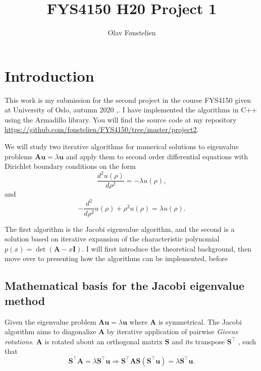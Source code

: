 \documentclass[]{article}
\title{FYS4150 H20 Project 1}
\author{Olav Fønstelien}
\begin{document}
\maketitle

\begin{abstract}

\end{abstract}

\section{Introduction}

This work is my submission for the second project in the course FYS4150 given at University of Oslo, autumn 2020 \cite{fys4150},\cite{fys4150-p2}. I have implemented the algorithms in C++ using the Armadillo library. You will find the source code at my repository \url{https://github.com/fonstelien/FYS4150/tree/master/project2}.

We will study two iterative algorithms for numerical solutions to eigenvalue problems $\mathbf{Au} = \lambda \mathbf{u}$ and apply them to second order differential equations with Dirichlet boundary conditions on the form
\begin{equation}
\label{diff_1}
	\frac{d^2 u(\rho)}{d\rho^2} = -\lambda u(\rho),
\end{equation}
and
\begin{equation}
\label{diff_2}
	-\frac{d^2}{d\rho^2} u(\rho) + \rho^2u(\rho)  = \lambda u(\rho).
\end{equation}

The first algorithm is the Jacobi eigenvalue algorithm, and the second is a solution based on iterative expansion of the characteristic polynomial $p(x) = \det(\mathbf{A} - x\mathbf{I})$. I will first introduce the theoretical background, then move over to presenting how the algorithms can be implemented, before 

\subsection{Mathematical basis for the Jacobi eigenvalue method}
Given the eigenvalue problem $\mathbf{Au} = \lambda \mathbf{u}$ where $\mathbf{A}$ is symmetrical. The Jacobi algorithm aims to diagonalize $\mathbf{A}$ by iterative application of pairwise \textit{Givens rotations}. $\mathbf{A}$ is rotated about an orthogonal matrix $\mathbf{S}$ and its transpose $\mathbf{S}^\intercal$ , such that 
\[
\mathbf{S}^\intercal \mathbf{A} = \lambda \mathbf{S}^\intercal \mathbf{u} \Rightarrow \mathbf{S}^\intercal \mathbf{A} \mathbf{S} (\mathbf{S}^\intercal \mathbf{u})= \lambda \mathbf{S}^\intercal \mathbf{u}.
\]
\end{document}
